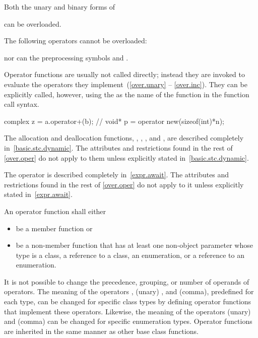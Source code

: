 \pnum
Both the unary and binary forms of
\begin{ncsimplebnf}\obeyspaces
\terminal{+      -      *      \&}
\end{ncsimplebnf}
can be overloaded.

\pnum
\begin{note}
%
The following operators cannot be overloaded:
\begin{ncsimplebnf}\obeyspaces
{}
\end{ncsimplebnf}
nor can the preprocessing symbols
\tcode{\#}
and
\tcode{\#\#}.
\end{note}

\pnum
{}%
Operator functions are usually not called directly; instead they are invoked
to evaluate the operators they implement~(\ref{over.unary} -- \ref{over.inc}).
They can be explicitly called, however, using the
as the name of the function in the function call syntax.
\begin{example}
\begin{codeblock}
complex z = a.operator+(b);     // 
void* p = operator new(sizeof(int)*n);
\end{codeblock}
\end{example}

\pnum
The allocation and deallocation functions,
 ,
 ,
 , and
 ,
are described completely in~\ref{basic.stc.dynamic}.
The attributes and restrictions
found in the rest of \ref{over.oper} do not apply to them unless explicitly
stated in~\ref{basic.stc.dynamic}.

\pnum
The  operator is described completely in~\ref{expr.await}.
The attributes and restrictions
found in the rest of \ref{over.oper} do not apply to it unless explicitly
stated in~\ref{expr.await}.

\pnum
{}%
An operator function
shall either
\begin{itemize}
\item
be a member function or
\item
be a non-member function that
has at least one non-object parameter whose type is a class, a reference to a class, an
enumeration, or a reference to an enumeration.
\end{itemize}
It is not possible to change the precedence, grouping, or number of operands
of operators.
The meaning of
the operators \tcode{=}, (unary) \tcode{\&}, and \tcode{,} (comma),
predefined for each type, can be changed for specific class types by
defining operator functions that implement these operators.
Likewise, the meaning of the operators (unary) \tcode{\&} and \tcode{,} (comma)
can be changed for specific enumeration types.
%
Operator functions are inherited in the same manner as other base class
functions.

